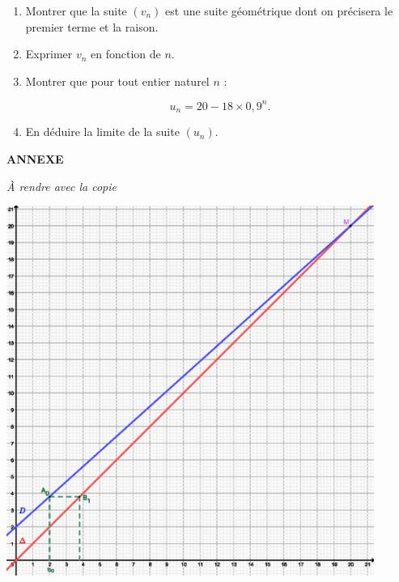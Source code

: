 \par
\begin{enumerate}
     \item
     Montrer que la suite $(v_n)$ est une suite géométrique dont on précisera le premier terme et la raison.
     \item
     Exprimer $v_n$ en fonction de $n$.
     \item
     Montrer que pour tout entier naturel $n$ :
     \par
     \[ u_n=20-18 \times 0,9^n. \]
     \item
     En déduire la limite de la suite $(u_n)$.
     \par
\end{enumerate}
\newpage
\begin{center}
     \textbf{ANNEXE}
\end{center}
\begin{center}
     \emph{\`A rendre avec la copie}
\end{center}
\medskip
\begin{center}
     \begin{extern}%
          \includegraphics[width=0.9\textwidth]{images/BBESL-s3-2-1.eps}%
     \end{extern}
\end{center}
\newpage
